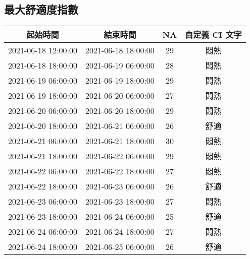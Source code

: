 \documentclass{article}%
\begin{document}
\begin{center}
\section{最大舒適度指數}%
\label{sec:}%
\begin{tabular}{|c|c|c|c|}%
\hline%
起始時間&結束時間&NA &自定義 CI 文字\\%
\hline%
2021{-}06{-}18 12:00:00&2021{-}06{-}18 18:00:00&29&悶熱\\%
\hline%
2021{-}06{-}18 18:00:00&2021{-}06{-}19 06:00:00&28&悶熱\\%
\hline%
2021{-}06{-}19 06:00:00&2021{-}06{-}19 18:00:00&29&悶熱\\%
\hline%
2021{-}06{-}19 18:00:00&2021{-}06{-}20 06:00:00&27&悶熱\\%
\hline%
2021{-}06{-}20 06:00:00&2021{-}06{-}20 18:00:00&29&悶熱\\%
\hline%
2021{-}06{-}20 18:00:00&2021{-}06{-}21 06:00:00&26&舒適\\%
\hline%
2021{-}06{-}21 06:00:00&2021{-}06{-}21 18:00:00&30&悶熱\\%
\hline%
2021{-}06{-}21 18:00:00&2021{-}06{-}22 06:00:00&29&悶熱\\%
\hline%
2021{-}06{-}22 06:00:00&2021{-}06{-}22 18:00:00&27&悶熱\\%
\hline%
2021{-}06{-}22 18:00:00&2021{-}06{-}23 06:00:00&26&舒適\\%
\hline%
2021{-}06{-}23 06:00:00&2021{-}06{-}23 18:00:00&27&悶熱\\%
\hline%
2021{-}06{-}23 18:00:00&2021{-}06{-}24 06:00:00&25&舒適\\%
\hline%
2021{-}06{-}24 06:00:00&2021{-}06{-}24 18:00:00&27&悶熱\\%
\hline%
2021{-}06{-}24 18:00:00&2021{-}06{-}25 06:00:00&26&舒適\\%
\hline%
\end{tabular}

%

\end{center}
\end{document}
